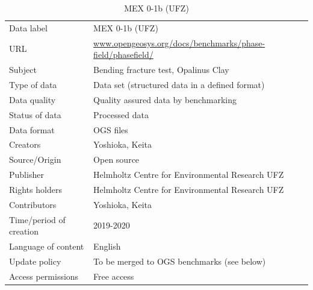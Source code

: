 \begin{table}[!ht]
\caption{MEX 0-1b (UFZ)}
\label{tab:dms-mex0-1a}
\small
\begin{tabular}{R{3.5cm}|L{7.5cm}}
\hline
%
Data label & MEX 0-1b (UFZ) \\
URL & \url{www.opengeosys.org/docs/benchmarks/phase-field/phasefield/} \\ 
Subject  & Bending fracture test, Opalinus Clay \\
Type of data  & Data set (structured data in a defined format) \\
Data quality  & Quality assured data by benchmarking \\
Status of data  & Processed data \\
Data format  & OGS files \\
Creators  & Yoshioka, Keita  \\
Source/Origin & Open source \\
Publisher  & Helmholtz Centre for Environmental Research UFZ \\
Rights holders & Helmholtz Centre for Environmental Research UFZ \\
Contributors & Yoshioka, Keita \\
Time/period of creation & 2019-2020 \\
Language of content & English \\
Update policy & To be merged to OGS benchmarks (see below) \\
Access permissions & Free access \\
%
\hline
\end{tabular}
\end{table}
